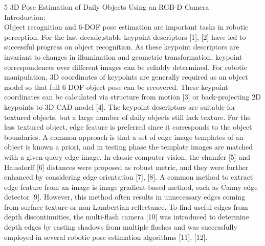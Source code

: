 \documentclass[10]{article}
\begin{document}
5 3D Pose Estimation of Daily Objects Using an RGB-D Camera\\

Introduction:\\

Object recognition and 6-DOF pose estimation are important tasks in robotic perception. For the last decade,stable keypoint descriptors [1], [2] have led to successful progress on object recognition. As these keypoint descriptors are invariant to changes in illumination and geometric transformation, keypoint correspondences over different images can be reliably determined. For robotic manipulation, 3D coordinates of keypoints are generally required as an object model so that full 6-DOF object pose can be recovered.
These keypoint coordinates can be calculated via structure from motion [3] or back-projecting 2D keypoints to 3D CAD model [4]. The keypoint descriptors are suitable for textured objects, but a large number of daily objects still lack texture. For the less textured object, edge feature is preferred since it corresponds to the object boundaries. A common approach is that a set of edge image templates of an object is known a priori, and in testing phase the template images are matched with a given query edge image. In classic computer vision, the chamfer [5] and Hausdorff [6] distances were proposed as robust metric, and they were further enhanced by considering edge orientation [7], [8]. A common method to extract edge feature from an image is image gradient-based method, such as Canny edge detector [9]. However, this method often results in unnecessary edges coming from surface texture or non-Lambertian reflectance. To find useful edges from depth discontinuities, the multi-flash camera [10] was introduced to determine depth edges by casting shadows from multiple
flashes and was successfully employed in several robotic pose estimation algorithms [11], [12].
\end{document}
